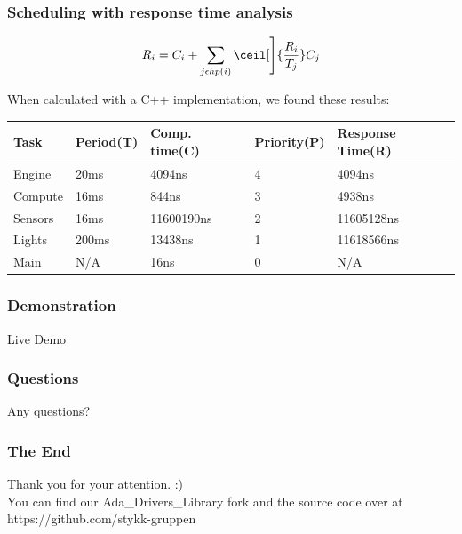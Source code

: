 \documentclass{beamer}
\begin{document}
\begin{frame}
    \centering
    \frametitle{Scheduling with response time analysis}
\begin{equation*}
  R_{i} = C_{i} + \sum_{j \epsilon hp(i)} \ceil[\Bigg]{\frac{R_{i}}{T_{j}}} C_{j}
\end{equation*}


When calculated with a C++ implementation, we found these results:


\begin{center}
 \begin{tabular}{||l l l l|l||}
 \hline
   Task & Period(T) & Comp. time(C) & Priority(P) & Response Time(R) \\ [0.5ex]
 \hline\hline
   Engine & 20ms & 4094ns & 4 & 4094ns \\
 \hline
   Compute & 16ms & 844ns & 3 & 4938ns \\
 \hline
   Sensors & 16ms & 11600190ns & 2 & 11605128ns \\
 \hline
   Lights & 200ms & 13438ns & 1 & 11618566ns \\
 \hline
   Main & N/A & 16ns & 0 & N/A \\ [1ex]
 \hline
\end{tabular}
\end{center}

\end{frame}

\begin{frame}
    \centering
    \frametitle{Demonstration}
    Live Demo
\end{frame}

\begin{frame}
    \centering
    \frametitle{Questions}
Any questions?
\end{frame}

\begin{frame}
    \centering
    \frametitle{The End}
    Thank you for your attention. :)\\
    You can find our Ada\_Drivers\_Library fork and the source code over at https://github.com/stykk-gruppen
\end{frame}
\end{document}
